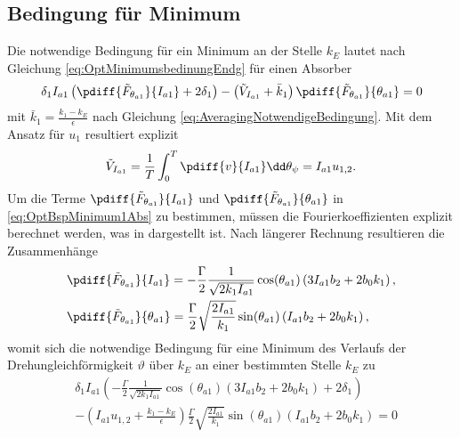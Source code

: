\subsection{Bedingung für Minimum} \label{subsec:Opt:Bsp:BedFuerMinimum}
%
%
%
Die notwendige Bedingung für ein Minimum an der Stelle $k_E$ lautet nach Gleichung \eqref{eq:OptMinimumsbedinungEndg}	für einen Absorber
%
%
\begin{equation}
			 \delta_1 I_{a1}  \left( \pdiff{\tilde{F}_{\theta_{a1}}}{{I_{a1}}} + 2 \delta_1 \right)
		                  - \left( \tilde{V}_{I_{a1}} + \bar{k}_1 \right)  \pdiff{\tilde{F}_{\theta_{a1}}}{{\theta_{a1}}}   = 0
											\label{eq:OptBspMinimum1Abs}
\end{equation}
%
mit $\bar{k}_1 = \frac{k_1 - k_E}{\epsilon}$ nach Gleichung  \eqref{eq:AveragingNotwendigeBedingung}. Mit dem Ansatz für $u_1$ resultiert 
explizit
%
%
\begin{equation}
	  \tilde{V}_{I_{a1}} = \frac{1}{T} \int_0^T{\pdiff{v}{{I_{a1}}} \dd \theta_{\psi}} = I_{a1} u_{1,2}. 
\end{equation}
%
%
%
%
%
%
Um die Terme $\pdiff{\tilde{F}_{\theta_{a1}}}{{I_{a1}}}$ und $\pdiff{\tilde{F}_{\theta_{a1}}}{{\theta_{a1}}}$  in \eqref{eq:OptBspMinimum1Abs} zu bestimmen,
müssen die Fourierkoeffizienten explizit berechnet werden, was in  dargestellt ist. Nach längerer Rechnung resultieren die Zusammenhänge
%
%
%
\begin{align}
		& \pdiff{\tilde{F}_{\theta_{a1}}}{{I_{a1}}}  
					= - \frac{\Gamma} {2} \frac{1}{\sqrt{2 k_1 I_{a1}} }  \cos(\theta_{a1})  \left(3 I_{a1} b_2 + 2 b_0 k_1\right) 
					, \\
		& \pdiff{\tilde{F}_{\theta_{a1}}}{{\theta_{a1}}}  	
					= \frac{\Gamma}{2} \sqrt{  \frac{2 I_{a1}}{k_1} } \sin (\theta_{a1})  \left(I_{a1} b_2 + 2 b_0 k_1\right)
					,
\end{align}
%
%
womit sich die notwendige Bedingung für eine Minimum des Verlaufs der Drehungleichförmigkeit $\vartheta$ über $k_E$ an einer bestimmten Stelle $k_E$ zu
%
%
\begin{equation}
	\begin{split}
			 & \delta_1 I_{a1}  \left( - \frac{\Gamma} {2} \frac{1}{\sqrt{2 k_1 I_{a1}} }  \cos(\theta_{a1})  \left(3 I_{a1} b_2 + 2 b_0 k_1\right)       + 2 \delta_1 \right)   \\
		   & - \left( I_{a1} u_{1,2} + \frac{k_1 - k_E}{\epsilon} \right)  \frac{\Gamma}{2} \sqrt{  \frac{2 I_{a1}}{k_1} } \sin (\theta_{a1})  \left(I_{a1} b_2 + 2 b_0 k_1\right) 
								= 0
	\end{split}
	\label{eq:OptBspMinimum1AbsEndg}
\end{equation}
